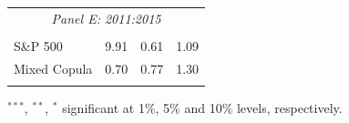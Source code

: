 \documentclass[pdf,10pt,xcolor=dvipsnames,hide notes]{beamer}
\begin{document}
\begin{frame}
\begin{threeparttable}[H]
\begin{tabularx}{\textwidth}{@{\extracolsep{\fill}}llll@{}}
		\multicolumn{4}{c}{\textit{Panel E: 2011:2015}} \\
		&       &       &       \\
		S\&P 500 & 9.91  & 0.61  & 1.09 \\
		Mixed Copula & 0.70  & 0.77  & 1.30 \\
		\multicolumn{1}{r}{} & \multicolumn{1}{r}{} & \multicolumn{1}{r}{} & \multicolumn{1}{r}{} \\
		\bottomrule
	\end{tabularx}%
	\begin{tablenotes}
		\item \scriptsize $^{\ast\ast\ast}$, $^{\ast\ast}$, $^{\ast}$  significant at 1\%, 5\% and 10\% levels, respectively.
	\end{tablenotes}
	\label{tab:table108}%
\end{threeparttable}%

\end{frame}
\end{document}
